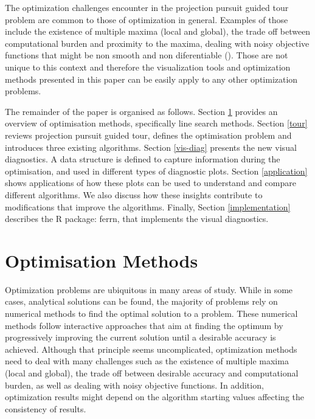 \documentclass[12pt]{article}
\begin{document}
The optimization challenges encounter in the projection pursuit guided tour problem are common to those of optimization in general. Examples of those include the existence of multiple maxima (local and global), the trade off between computational burden and proximity to the maxima, dealing with noisy objective functions that might be non smooth and non diferentiable (\citet{jones1998efficient}). Those are not unique to this context and therefore the visualization tools and optimization methods presented in this paper can be easily apply to any other optimization problems.

The remainder of the paper is organised as follows.
Section \ref{optim} provides an overview of optimisation methods, specifically line search methods.
Section \ref{tour} reviews projection pursuit guided tour, defines the optimisation problem and introduces three existing algorithms.
Section \ref{vis-diag} presents the new visual diagnostics. A data structure is defined to capture information during the optimisation, and used in different types of diagnostic plots.
Section \ref{application} shows applications of how these plots can be used to understand and compare different algorithms. We also discuss how these insights contribute to modifications that improve the algorithms.
Finally, Section \ref{implementation} describes the R package: ferrn, that implements the visual diagnostics.

\hypertarget{optim}{%
\section{Optimisation Methods}\label{optim}}

Optimization problems are ubiquitous in many areas of study. While in some cases, analytical solutions can be found, the majority of problems rely on numerical methods to find the optimal solution to a problem. These numerical methods follow interactive approaches that aim at finding the optimum by progressively improving the current solution until a desirable accuracy is achieved. Although that principle seems uncomplicated, optimization methods need to deal with many challenges such as the existence of multiple maxima (local and global), the trade off between desirable accuracy and computational burden, as well as dealing with noisy objective functions. In addition, optimization results might depend on the algorithm starting values affecting the consistency of results.
\end{document}
